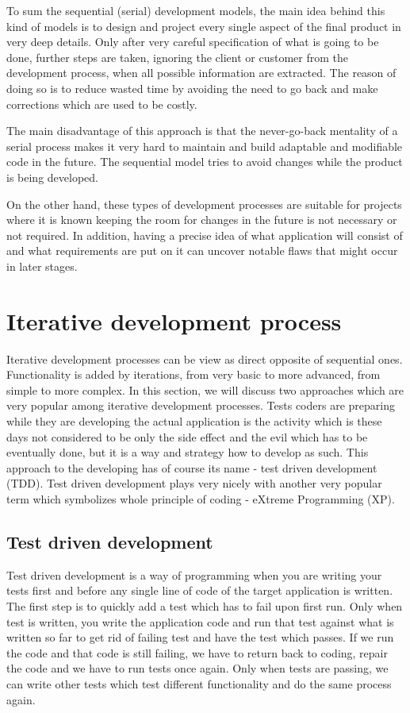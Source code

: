\documentclass[12pt,final,oneside]{fithesis}
\begin{document}
To sum the sequential (serial) development models, the main idea behind this kind of models is to design and project every single aspect of the final product in very deep details. Only after very careful specification of what is going to be done, further steps are taken, ignoring the client or customer from the development process, when all possible information are extracted. The reason of doing so is to reduce wasted time by avoiding the need to go back and make corrections which are used to be costly.

The main disadvantage of this approach is that the never-go-back mentality of a serial process makes it very hard to maintain and build adaptable and modifiable code in the future. The sequential model tries to avoid changes while the product is being developed.

On the other hand, these types of development processes are suitable for projects where it is known keeping the room for changes in the future is not necessary or not required. In addition, having a precise idea of what application will consist of and what requirements are put on it can uncover notable flaws that might occur in later stages.

	\section{Iterative development process}

Iterative development processes can be view as direct opposite of sequential ones. Functionality is added by iterations, from very basic to more advanced, from simple to more complex. In this section, we will discuss two approaches which are very popular among iterative development processes. Tests coders are preparing while they are developing the actual application is the activity which is these days not considered to be only the side effect and the evil which has to be eventually done, but it is a way and strategy how to develop as such. This approach to the developing has of course its name - test driven development (TDD). Test driven development plays very nicely with another very popular term which symbolizes whole principle of coding - eXtreme Programming (XP).

	\subsection{Test driven development}
Test driven development is a way of programming when you are writing your tests first and before any single line of code of the target application is written. The first step is to quickly add a test which has to fail upon first run. Only when test is written, you write the application code and run that test against what is written so far to get rid of failing test and have the test which passes. If we run the code and that code is still failing, we have to return back to coding, repair the code and we have to run tests once again. Only when tests are passing, we can write other tests which test different functionality and do the same process again.
\end{document}
